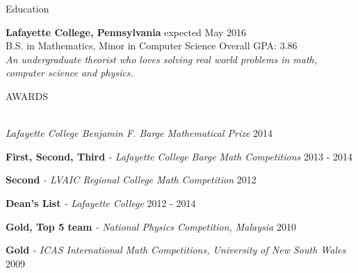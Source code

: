 \documentclass{resume} %
\begin{document}
\begin{rSection}{Education}

{\bf Lafayette College, Pennsylvania} \hfill expected May 2016\\ 
B.S. in Mathematics, Minor in Computer Science \hfill Overall GPA: 3.86\\
{\em An undergraduate theorist who loves solving real world problems in math, computer science and physics. }

\end{rSection}



\begin{rSection}{AWARDS}

{\setlength{\parskip}{1.8pt}

\ \\
{\sl Lafayette College Benjamin F. Barge Mathematical Prize} \hfill 2014

{\bf First, Second, Third }{\sl - Lafayette College Barge Math Competitions } \hfill 2013 - 2014

{\bf Second }{\sl - LVAIC Regional College Math Competition} \hfill  2012

{\bf Dean's List }{\sl - Lafayette College} \hfill 2012 - 2014

{\bf Gold, Top 5 team }{\sl - National Physics Competition, Malaysia} \hfill 2010 

{\bf Gold }{\sl - ICAS International Math Competitions, University of New South Wales} \hfill  2009}
\end{rSection}


\end{document}
